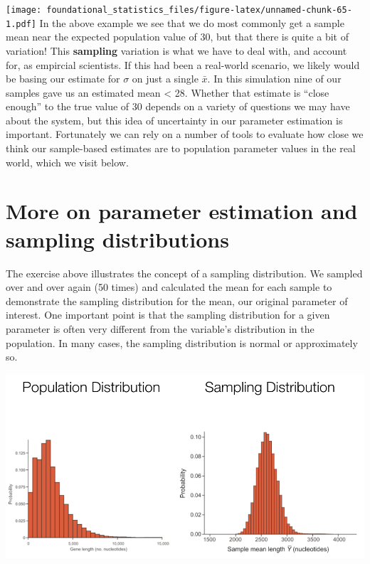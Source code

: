 \documentclass[]{book}
\begin{document}
\texttt{[image: foundational\_statistics\_files/figure-latex/unnamed-chunk-65-1.pdf]}
In the above example we see that we do most commonly get a sample mean near the expected population value of 30, but that there is quite a bit of variation! This \textbf{sampling} variation is what we have to deal with, and account for, as empircial scientists. If this had been a real-world scenario, we likely would be basing our estimate for \(\sigma\) on just a single \(\bar{x}\). In this simulation nine of our samples gave us an estimated mean \textless{} 28. Whether that estimate is ``close enough'' to the true value of 30 depends on a variety of questions we may have about the system, but this idea of uncertainty in our parameter estimation is important. Fortunately we can rely on a number of tools to evaluate how close we think our sample-based estimates are to population parameter values in the real world, which we visit below.

\hypertarget{more-on-parameter-estimation-and-sampling-distributions}{%
\section{More on parameter estimation and sampling distributions}\label{more-on-parameter-estimation-and-sampling-distributions}}

The exercise above illustrates the concept of a sampling distribution. We sampled over and over again (50 times) and calculated the mean for each sample to demonstrate the sampling distribution for the mean, our original parameter of interest. One important point is that the sampling distribution for a given parameter is often very different from the variable's distribution in the population. In many cases, the sampling distribution is normal or approximately so.

\begin{center}\includegraphics[width=1\linewidth]{images/week_2.025} \end{center}
\end{document}
